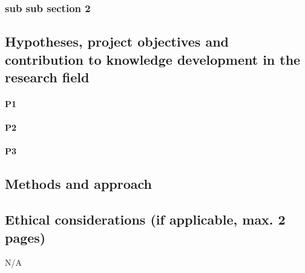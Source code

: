 \documentclass[a4paper, 11pt]{article}
\begin{document}
\subsubsection{sub sub section 2}
\lipsum[8]

\subsection{Hypotheses, project objectives and contribution to knowledge development in the research field}
\paragraph{P1}
\lipsum[4]

\paragraph{P2}
\lipsum[5]

\paragraph{P3}
\lipsum[6]

\subsection{Methods and approach}\label{sec:approach}

\subsection{Ethical considerations (if applicable, max. 2 pages)}
N/A

\newpage
\end{document}
